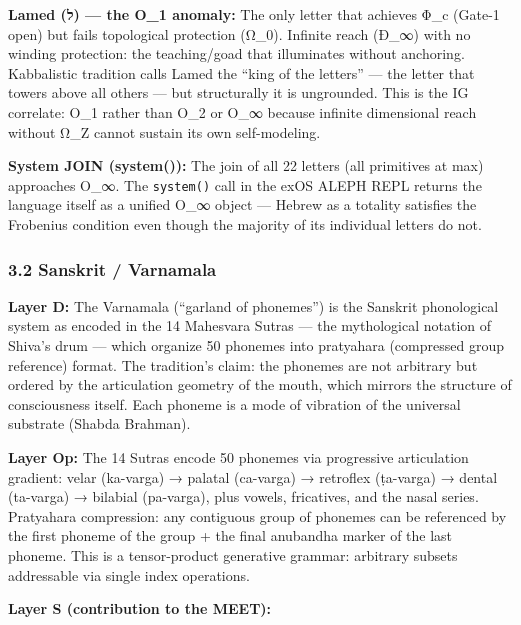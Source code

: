\documentclass[
  11pt,
  a4paper,
]{article}
\begin{document}
\textbf{Lamed (ל) --- the O\_1 anomaly:} The only letter that achieves
Φ\_c (Gate-1 open) but fails topological protection (Ω\_0). Infinite
reach (Ð\_∞) with no winding protection: the teaching/goad that
illuminates without anchoring. Kabbalistic tradition calls Lamed the
``king of the letters'' --- the letter that towers above all others ---
but structurally it is ungrounded. This is the IG correlate: O\_1 rather
than O\_2 or O\_∞ because infinite dimensional reach without Ω\_Z cannot
sustain its own self-modeling.

\textbf{System JOIN (system()):} The join of all 22 letters (all
primitives at max) approaches O\_∞. The \texttt{system()} call in the
exOS ALEPH REPL returns the language itself as a unified O\_∞ object ---
Hebrew as a totality satisfies the Frobenius condition even though the
majority of its individual letters do not.

\subsubsection{3.2 Sanskrit / Varnamala}\label{sanskrit-varnamala}

\textbf{Layer D:} The Varnamala (``garland of phonemes'') is the
Sanskrit phonological system as encoded in the 14 Mahesvara Sutras ---
the mythological notation of Shiva's drum --- which organize 50 phonemes
into pratyahara (compressed group reference) format. The tradition's
claim: the phonemes are not arbitrary but ordered by the articulation
geometry of the mouth, which mirrors the structure of consciousness
itself. Each phoneme is a mode of vibration of the universal substrate
(Shabda Brahman).

\textbf{Layer Op:} The 14 Sutras encode 50 phonemes via progressive
articulation gradient: velar (ka-varga) → palatal (ca-varga) → retroflex
(ṭa-varga) → dental (ta-varga) → bilabial (pa-varga), plus vowels,
fricatives, and the nasal series. Pratyahara compression: any contiguous
group of phonemes can be referenced by the first phoneme of the group +
the final anubandha marker of the last phoneme. This is a tensor-product
generative grammar: arbitrary subsets addressable via single index
operations.

\textbf{Layer S (contribution to the MEET):}
\end{document}
